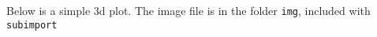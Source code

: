 Below is a simple 3d plot. The image file is in the folder \texttt{img}, included with \texttt{subimport}
\Blindtext
